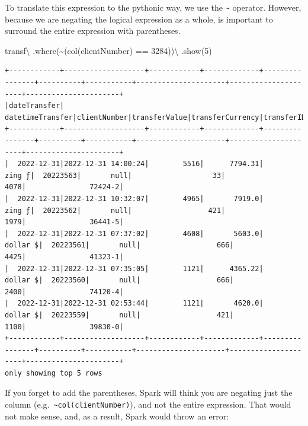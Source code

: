 \documentclass[
  11pt,
  letterpaper,
  DIV=11,
  numbers=noendperiod]{scrreprt}
\newenvironment{Shaded}{\begin{snugshade}}{\end{snugshade}}
\newcommand{\DecValTok}[1]{\textcolor[rgb]{0.68,0.00,0.00}{#1}}
\newcommand{\NormalTok}[1]{\textcolor[rgb]{0.00,0.23,0.31}{#1}}
\newcommand{\OperatorTok}[1]{\textcolor[rgb]{0.37,0.37,0.37}{#1}}
\newcommand{\StringTok}[1]{\textcolor[rgb]{0.13,0.47,0.30}{#1}}
\begin{document}
To translate this expression to the pythonic way, we use the
\texttt{\textasciitilde{}} operator. However, because we are negating
the logical expression as a whole, is important to surround the entire
expression with parentheses.

\begin{Shaded}
\begin{Highlighting}[]
\NormalTok{transf}\OperatorTok{\textbackslash{}}
\NormalTok{  .where(}\OperatorTok{\textasciitilde{}}\NormalTok{(col(}\StringTok{\textquotesingle{}clientNumber\textquotesingle{}}\NormalTok{) }\OperatorTok{==} \DecValTok{3284}\NormalTok{))}\OperatorTok{\textbackslash{}}
\NormalTok{  .show(}\DecValTok{5}\NormalTok{)}
\end{Highlighting}
\end{Shaded}

\begin{verbatim}
+------------+-------------------+------------+-------------+----------------+----------+-----------+---------------------+---------------------+----------------------+
|dateTransfer|   datetimeTransfer|clientNumber|transferValue|transferCurrency|transferID|transferLog|destinationBankNumber|destinationBankBranch|destinationBankAccount|
+------------+-------------------+------------+-------------+----------------+----------+-----------+---------------------+---------------------+----------------------+
|  2022-12-31|2022-12-31 14:00:24|        5516|      7794.31|          zing ƒ|  20223563|       null|                   33|                 4078|               72424-2|
|  2022-12-31|2022-12-31 10:32:07|        4965|       7919.0|          zing ƒ|  20223562|       null|                  421|                 1979|               36441-5|
|  2022-12-31|2022-12-31 07:37:02|        4608|       5603.0|        dollar $|  20223561|       null|                  666|                 4425|               41323-1|
|  2022-12-31|2022-12-31 07:35:05|        1121|      4365.22|        dollar $|  20223560|       null|                  666|                 2400|               74120-4|
|  2022-12-31|2022-12-31 02:53:44|        1121|       4620.0|        dollar $|  20223559|       null|                  421|                 1100|               39830-0|
+------------+-------------------+------------+-------------+----------------+----------+-----------+---------------------+---------------------+----------------------+
only showing top 5 rows
\end{verbatim}

If you forget to add the parentheses, Spark will think you are negating
just the column
(e.g.~\texttt{\textasciitilde{}col(\textquotesingle{}clientNumber\textquotesingle{})}),
and not the entire expression. That would not make sense, and, as a
result, Spark would throw an error:
\end{document}

